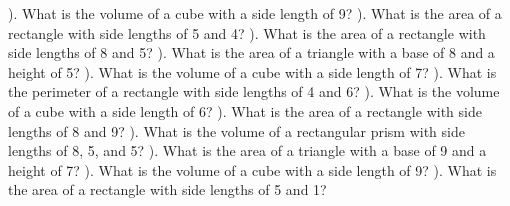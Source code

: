 \documentclass{article}%
\begin{document}
). What is the volume of a cube with a side length of 9?%
\newline%
\newline%
). What is the area of a rectangle with side lengths of 5 and 4?%
\newline%
\newline%
). What is the area of a rectangle with side lengths of 8 and 5?%
\newline%
\newline%
). What is the area of a triangle with a base of 8 and a height of 5?%
\newline%
\newline%
). What is the volume of a cube with a side length of 7?%
\newline%
\newline%
). What is the perimeter of a rectangle with side lengths of 4 and 6?%
\newline%
\newline%
). What is the volume of a cube with a side length of 6?%
\newline%
\newline%
). What is the area of a rectangle with side lengths of 8 and 9?%
\newline%
\newline%
). What is the volume of a rectangular prism with side lengths of 8, 5, and 5?%
\newline%
\newline%
). What is the area of a triangle with a base of 9 and a height of 7?%
\newline%
\newline%
). What is the volume of a cube with a side length of 9?%
\newline%
\newline%
). What is the area of a rectangle with side lengths of 5 and 1?%
\newline%
\newline%
\end{document}
